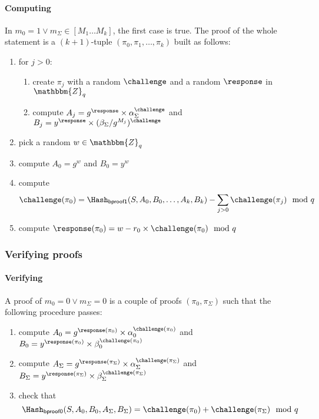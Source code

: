 \documentclass[a4paper]{article}
\newcommand{\Z}{\mathbbm{Z}}
\begin{document}
\paragraph{Computing \oproof}
In $m_0=1\lor m_\Sigma\in[M_1\dots M_k]$, the first case is
true. The proof of the whole statement is a $(k+1)$-tuple
$(\pi_0,\pi_1,\dotsc,\pi_k)$ built as follows:
\begin{enumerate}
\item for $j>0$:
  \begin{enumerate}
  \item create $\pi_j$ with a random $\challenge$ and a random
    $\response$ in $\Z_q$
  \item compute
    $A_j={g^\response}\times{\alpha_\Sigma^\challenge}$ and
    $B_j={y^\response}\times{(\beta_\Sigma/g^{M_j})^\challenge}$
  \end{enumerate}
\item pick a random $w\in\Z_q$
\item compute $A_0=g^w$ and $B_0=y^w$
\item compute
  \[\challenge(\pi_0)=\Hash_{\textsf{bproof1}}(S,A_0,B_0,\dots,A_k,B_k)-\sum_{j>0}\challenge(\pi_j)\mod q\]
\item compute $\response(\pi_0)=w-r_0\times\challenge(\pi_0)\mod q$
\end{enumerate}

\subsubsection{Verifying proofs}

\paragraph{Verifying \bproof}
A proof of $m_0=0\lor m_\Sigma=0$ is a couple of proofs
$(\pi_0,\pi_\Sigma)$ such that the following procedure passes:
\begin{enumerate}
\item compute
  $A_0=g^{\response(\pi_0)}\times\alpha_0^{\challenge(\pi_0)}$
  and
  $B_0=y^{\response(\pi_0)}\times\beta_0^{\challenge(\pi_0)}$
\item compute
  $A_\Sigma=g^{\response(\pi_\Sigma)}\times\alpha_\Sigma^{\challenge(\pi_\Sigma)}$
  and
  $B_\Sigma=y^{\response(\pi_\Sigma)}\times\beta_\Sigma^{\challenge(\pi_\Sigma)}$
\item check that
  \[\Hash_{\mathsf{bproof0}}(S,A_0,B_0,A_\Sigma,B_\Sigma)=\challenge(\pi_0)+\challenge(\pi_\Sigma)\mod q\]
\end{enumerate}
\end{document}
